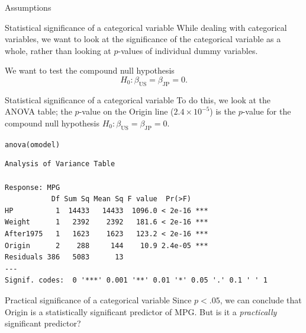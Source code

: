 \documentclass{beamer}\usepackage[]{graphicx}\usepackage[]{color}
\makeatletter
\newcommand{\hlstd}[1]{\textcolor[rgb]{1,0.894,0.769}{#1}}%
\newcommand{\hlkwd}[1]{\textcolor[rgb]{1,0.78,0.769}{#1}}%
\newenvironment{kframe}{%
 \def\at@end@of@kframe{}%
 \ifinner\ifhmode%
  \def\at@end@of@kframe{\end{minipage}}%
  \begin{minipage}{\columnwidth}%
 \fi\fi%
 \def\FrameCommand##1{\hskip\@totalleftmargin \hskip-\fboxsep
 \colorbox{shadecolor}{##1}\hskip-\fboxsep
     \hskip-\linewidth \hskip-\@totalleftmargin \hskip\columnwidth}%
 \MakeFramed {\advance\hsize-\width
   \@totalleftmargin\z@ \linewidth\hsize
   \@setminipage}}%
 {\par\unskip\endMakeFramed%
 \at@end@of@kframe}
\newenvironment{knitrout}{}{} %
\makeatother
\begin{document}
\begin{darkframes}
\begin{frame}[fragile]{Assumptions}
\begin{knitrout}
\end{knitrout}

\end{frame}

\begin{frame}[fragile]{Statistical significance of a categorical variable}
        While dealing with categorical variables, we want to look at the significance of the categorical variable as a whole, rather than looking at $p$-values of individual dummy variables.

        \bigskip\pause

        We want to test the \alert{compound null hypothesis}
        \[
          H_0 : \beta_{\text{US}} = \beta_{\text{JP}} = 0.
        \]
\end{frame}

\begin{frame}[fragile]{Statistical significance of a categorical variable}
        To do this, we look at the ANOVA table; the $p$-value on the Origin line ($2.4 \times 10^{-5}$) is the $p$-value for the compound null hypothesis $H_0 : \beta_{\text{US}} = \beta_{\text{JP}} = 0$.
        \fontsize{9}{9}\selectfont
\begin{knitrout}
\begin{kframe}
\begin{alltt}
\hlkwd{anova}\hlstd{(omodel)}
\end{alltt}
\begin{verbatim}
Analysis of Variance Table

Response: MPG
           Df Sum Sq Mean Sq F value  Pr(>F)    
HP          1  14433   14433  1096.0 < 2e-16 ***
Weight      1   2392    2392   181.6 < 2e-16 ***
After1975   1   1623    1623   123.2 < 2e-16 ***
Origin      2    288     144    10.9 2.4e-05 ***
Residuals 386   5083      13                    
---
Signif. codes:  0 '***' 0.001 '**' 0.01 '*' 0.05 '.' 0.1 ' ' 1
\end{verbatim}
\end{kframe}
\end{knitrout}
\end{frame}

\begin{frame}{Practical significance of a categorical variable}
        Since $p<.05$, we can conclude that Origin is a statistically significant predictor of MPG.
        But is it a \emph{practically} significant predictor?

        \bigskip\pause


\end{frame}
\end{darkframes}
\end{document}
